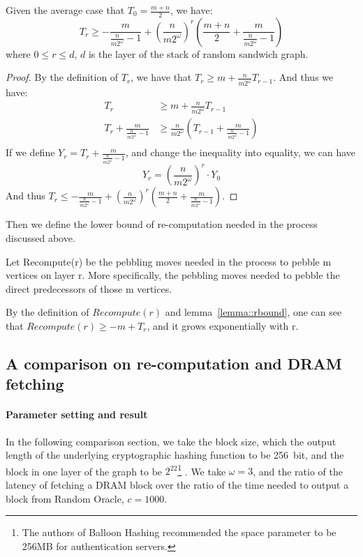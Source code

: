 \begin{lemma}\label{lemma::rbound}
  Given the average case that $T_0 = \frac{m+n}{2}$, we have:
  \begin{equation}
    T_r \geq -\frac{m}{\frac{n}{m2^\omega} - 1} + (\frac{n}{m2^\omega})^r(\frac{m+n}{2}+\frac{m}{\frac{n}{m2^\omega} - 1})
  \end{equation}
  where $0 \leq r \leq d$, $d$ is the layer of the stack of random sandwich graph.
\end{lemma}
\begin{proof}
  By the definition of $T_r$, we have that $T_r \geq m + \frac{n}{m2^\omega}T_{r-1}$. And thus we have:
  \begin{align}
    T_r &\geq m + \frac{n}{m2^\omega}T_{r-1}\\
    T_r + \frac{m}{\frac{n}{m2^\omega} - 1} &\geq \frac{n}{m2^\omega}(T_{r-1} + \frac{m}{\frac{n}{m2^\omega} - 1})\\
  \end{align}
  If we define $Y_r = T_r + \frac{m}{\frac{n}{m2^\omega} - 1}$, and change the inequality into equality, we can have
  \begin{equation}
    Y_r = (\frac{n}{m2^\omega})^r \cdot Y_0
  \end{equation}
  And thus $T_r \leq -\frac{m}{\frac{n}{m2^\omega} - 1} + (\frac{n}{m2^\omega})^r(\frac{m+n}{2}+\frac{m}{\frac{n}{m2^\omega} - 1})$.
\end{proof}

Then we define the lower bound of re-computation needed in the process discussed above.
\begin{definition}
  Let Recompute(r) be the pebbling moves needed in the process to pebble m vertices on layer r. More specifically, the pebbling moves needed to
  pebble the direct predecessors of those m vertices.
\end{definition}

By the definition of $Recompute(r)$ and lemma~\ref{lemma::rbound}, one can see that $Recompute(r) \geq -m + T_r$, and it grows exponentially with r.

\subsection{A comparison on re-computation and DRAM fetching}
\paragraph{Parameter setting and result}
In the following comparison section, we take the block size, which the output length of the underlying cryptographic hashing function to be 256~bit,
and the block in one layer of the graph to be $2^22$\footnote{The authors of Balloon Hashing recommended the space parameter to be 256MB for authentication servers.}
. We take $\omega = 3$, and the ratio of the latency of fetching a DRAM block over the ratio of
the time needed to output a block from Random Oracle, $c = 1000$.

